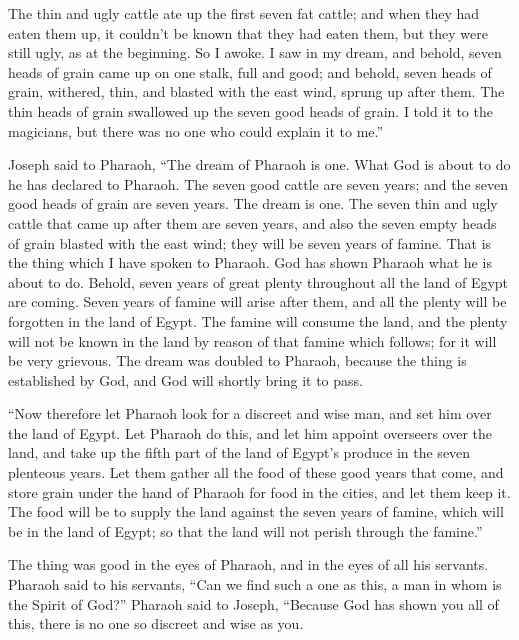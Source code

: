{The thin and ugly cattle ate up the first seven fat cattle;
and when they had eaten them up, it couldn’t be known that they had eaten them, but they were still ugly, as at the beginning. So I awoke.
I saw in my dream, and behold, seven heads of grain came up on one stalk, full and good;
and behold, seven heads of grain, withered, thin, and blasted with the east wind, sprung up after them.
The thin heads of grain swallowed up the seven good heads of grain. I told it to the magicians, but there was no one who could explain it to me.”
\par }{\PP {}Joseph said to Pharaoh, “The dream of Pharaoh is one. What God is about to do he has declared to Pharaoh.
The seven good cattle are seven years; and the seven good heads of grain are seven years. The dream is one.
The seven thin and ugly cattle that came up after them are seven years, and also the seven empty heads of grain blasted with the east wind; they will be seven years of famine.
That is the thing which I have spoken to Pharaoh. God has shown Pharaoh what he is about to do.
Behold, seven years of great plenty throughout all the land of Egypt are coming.
Seven years of famine will arise after them, and all the plenty will be forgotten in the land of Egypt. The famine will consume the land,
and the plenty will not be known in the land by reason of that famine which follows; for it will be very grievous.
The dream was doubled to Pharaoh, because the thing is established by God, and God will shortly bring it to pass.
\par }{\PP {}“Now therefore let Pharaoh look for a discreet and wise man, and set him over the land of Egypt.
Let Pharaoh do this, and let him appoint overseers over the land, and take up the fifth part of the land of Egypt’s produce in the seven plenteous years.
Let them gather all the food of these good years that come, and store grain under the hand of Pharaoh for food in the cities, and let them keep it.
The food will be to supply the land against the seven years of famine, which will be in the land of Egypt; so that the land will not perish through the famine.”
\par }{\PP {}The thing was good in the eyes of Pharaoh, and in the eyes of all his servants.
Pharaoh said to his servants, “Can we find such a one as this, a man in whom is the Spirit of God?”
Pharaoh said to Joseph, “Because God has shown you all of this, there is no one so discreet and wise as you.
}
